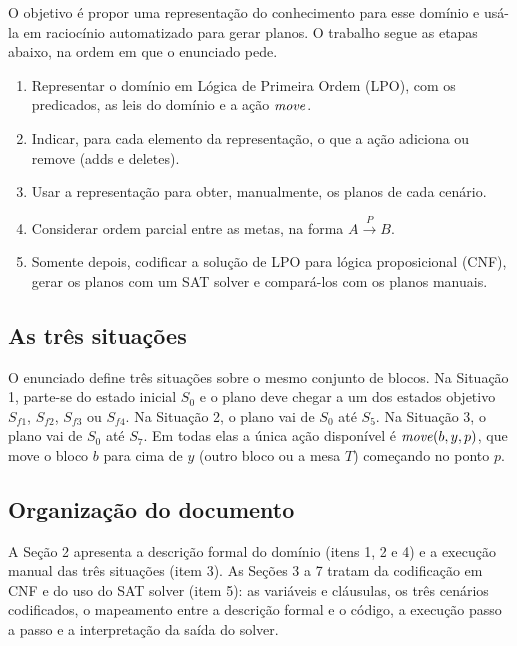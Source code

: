 O objetivo \'e propor uma representa\c{c}\~ao do conhecimento para esse dom\'inio e us\'a-la em racioc\'inio automatizado para gerar planos.
O trabalho segue as etapas abaixo, na ordem em que o enunciado pede.
\begin{enumerate}
\item Representar o dom\'inio em L\'ogica de Primeira Ordem (LPO), com os predicados, as leis do dom\'inio e a a\c{c}\~ao $\mathit{move}$.
\item Indicar, para cada elemento da representa\c{c}\~ao, o que a a\c{c}\~ao adiciona ou remove (adds e deletes).
\item Usar a representa\c{c}\~ao para obter, manualmente, os planos de cada cen\'ario.
\item Considerar ordem parcial entre as metas, na forma $A \xrightarrow{P} B$.
\item Somente depois, codificar a solu\c{c}\~ao de LPO para l\'ogica proposicional (CNF), gerar os planos com um SAT solver e compar\'a-los com os planos manuais.
\end{enumerate}

\subsection{As tr\^es situa\c{c}\~oes}

O enunciado define tr\^es situa\c{c}\~oes sobre o mesmo conjunto de blocos.
Na Situa\c{c}\~ao 1, parte-se do estado inicial $S_0$ e o plano deve chegar a um dos estados objetivo $S_{f1}$, $S_{f2}$, $S_{f3}$ ou $S_{f4}$.
Na Situa\c{c}\~ao 2, o plano vai de $S_0$ at\'e $S_5$.
Na Situa\c{c}\~ao 3, o plano vai de $S_0$ at\'e $S_7$.
Em todas elas a \'unica a\c{c}\~ao dispon\'ivel \'e $\mathit{move}(b,y,p)$, que move o bloco $b$ para cima de $y$ (outro bloco ou a mesa $T$) come\c{c}ando no ponto $p$.

\subsection{Organiza\c{c}\~ao do documento}

A Se\c{c}\~ao 2 apresenta a descri\c{c}\~ao formal do dom\'inio (itens 1, 2 e 4) e a execu\c{c}\~ao manual das tr\^es situa\c{c}\~oes (item 3).
As Se\c{c}\~oes 3 a 7 tratam da codifica\c{c}\~ao em CNF e do uso do SAT solver (item 5): as vari\'aveis e cl\'ausulas, os tr\^es cen\'arios codificados, o mapeamento entre a descri\c{c}\~ao formal e o c\'odigo, a execu\c{c}\~ao passo a passo e a interpreta\c{c}\~ao da sa\'ida do solver.
